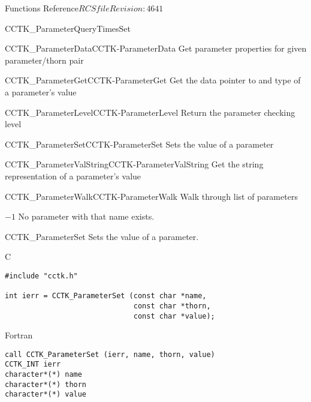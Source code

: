 \begin{cactuspart}{ Functions Reference}{$RCSfile$}{$Revision: 4641 $}
\begin{FunctionDescription}{CCTK\_ParameterQueryTimesSet}
\begin{SeeAlsoSection}
\begin{SeeAlso2}{CCTK\_ParameterData}{CCTK-ParameterData}
  Get parameter properties for given parameter/thorn pair
\end{SeeAlso2}
\begin{SeeAlso2}{CCTK\_ParameterGet}{CCTK-ParameterGet}
  Get the data pointer to and type of a parameter's value
\end{SeeAlso2}
\begin{SeeAlso2}{CCTK\_ParameterLevel}{CCTK-ParameterLevel}
  Return the parameter checking level
\end{SeeAlso2}
\begin{SeeAlso2}{CCTK\_ParameterSet}{CCTK-ParameterSet}
  Sets the value of a parameter
\end{SeeAlso2}
\begin{SeeAlso2}{CCTK\_ParameterValString}{CCTK-ParameterValString}
  Get the string representation of a parameter's value
\end{SeeAlso2}
\begin{SeeAlso2}{CCTK\_ParameterWalk}{CCTK-ParameterWalk}
  Walk through list of parameters
\end{SeeAlso2}
\end{SeeAlsoSection}

\begin{ErrorSection}
\begin{Error}{$-1$}
No parameter with that name exists.
\end{Error}
\end{ErrorSection}
\end{FunctionDescription}


\begin{FunctionDescription}{CCTK\_ParameterSet}
\label{CCTK-ParameterSet}
Sets the value of a parameter.

\begin{SynopsisSection}
\begin{Synopsis}{C}
\begin{verbatim}
#include "cctk.h"

int ierr = CCTK_ParameterSet (const char *name,
                              const char *thorn,
                              const char *value);
\end{verbatim}
\end{Synopsis}

\begin{Synopsis}{Fortran}
\begin{verbatim}
call CCTK_ParameterSet (ierr, name, thorn, value)
CCTK_INT ierr
character*(*) name
character*(*) thorn
character*(*) value
\end{verbatim}
\end{Synopsis}
\end{SynopsisSection}


\end{FunctionDescription}
\end{cactuspart}
